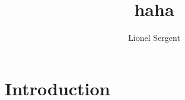 \documentclass[10pt]{article}
\title{haha}
\author{Lionel Sergent}
\begin{document}
\maketitle
\section{Introduction}


\end{document}
